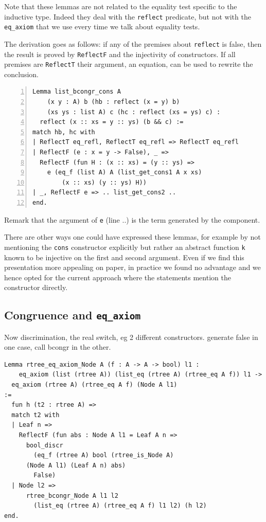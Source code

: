 \documentclass[sigplan,10pt,review]{acmart}\settopmatter{printfolios=true,printccs=false,printacmref=false}
\newcommand{\derive}[1]{\keys{#1}}
\begin{document}
\noindent
Note that these lemmas are not related to the
equality test specific to the inductive type. Indeed they deal
with the \lstinline+reflect+ predicate, but not with the
\lstinline+eq_axiom+ that we use every time we talk about equality tests.

The derivation goes as follows: if any of the premises about
\lstinline+reflect+ is false, then the result is proved by
\lstinline+ReflectF+ and the injectivity of constructors.
If all premises are \lstinline+ReflectT+ their argument,
an equation, can be used to rewrite the conclusion.

\begin{minipage}{\textwidth}\begin{lstlisting}[numbers=left]
Lemma list_bcongr_cons A 
    (x y : A) b (hb : reflect (x = y) b)
    (xs ys : list A) c (hc : reflect (xs = ys) c) :
  reflect (x :: xs = y :: ys) (b && c) :=
match hb, hc with
| ReflectT eq_refl, ReflectT eq_refl => ReflectT eq_refl
| ReflectF (e : x = y -> False), _ =>
  ReflectF (fun H : (x :: xs) = (y :: ys) =>
    e (eq_f (list A) A (list_get_cons1 A x xs)
        (x :: xs) (y :: ys) H))
| _, ReflectF e => .. list_get_cons2 ..
end.
\end{lstlisting}\end{minipage}

Remark that the argument of \lstinline+e+ (line ..)
is the term generated by the \derive{injection} component.

There are other ways one could have expressed these lemmas,
for example by not mentioning the \lstinline+cons+
constructor explicitly but rather an abstract function \lstinline+k+
known to be injective on the first and second argument.
Even if we find this presentation more appealing on paper, in practice
we found no advantage and we hence opted for the current approach
where the statements mention the constructor directly.

\subsection{Congruence and \lstinline+eq_axiom+} %

Now discrimination, the real switch, eg 2 different constructors.
generate false in one case, call bcongr in the other.

\begin{minipage}{\textwidth}\begin{lstlisting}
Lemma rtree_eq_axiom_Node A (f : A -> A -> bool) l1 :
    eq_axiom (list (rtree A)) (list_eq (rtree A) (rtree_eq A f)) l1 ->
  eq_axiom (rtree A) (rtree_eq A f) (Node A l1)
:=
  fun h (t2 : rtree A) =>
  match t2 with
  | Leaf n =>
    ReflectF (fun abs : Node A l1 = Leaf A n =>
      bool_discr
        (eq_f (rtree A) bool (rtree_is_Node A)
	  (Node A l1) (Leaf A n) abs)
        False)
  | Node l2 =>
      rtree_bcongr_Node A l1 l2
        (list_eq (rtree A) (rtree_eq A f) l1 l2) (h l2)
end.
\end{lstlisting}\end{minipage}
\end{document}
